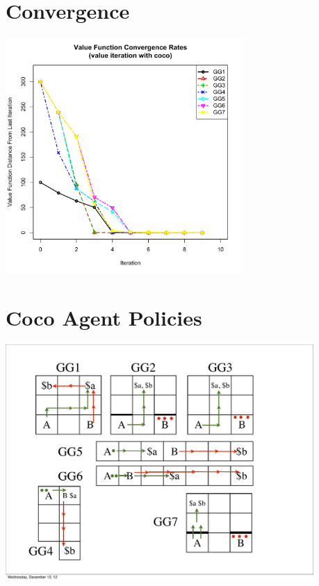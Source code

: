 \section{Convergence}
\includegraphics[height=90mm]{text/plot.pdf}

\section{Coco Agent Policies}
\includegraphics[height=90mm]{text/games.pdf}


